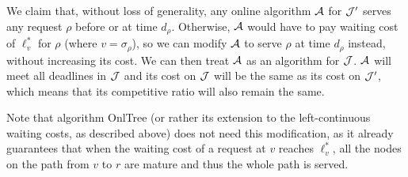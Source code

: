 \documentclass[a4paper]{article}
\newcommand{\calA}{{\cal A}}
\newcommand{\calJ}{{\cal J}}
\newcommand{\length}{\ell}
\newcommand{\OnAlgTreesGeneral}{{\sc OnlTree}}
\newcommand{\trignode}{\sigma}
\begin{document}
We claim that, without loss of generality, any online algorithm
$\calA$ for $\calJ'$ serves any request $\rho$ before or at time $d_\rho$.
Otherwise, $\calA$ would have to pay waiting cost of $\length^\ast_v$ for $\rho$
(where $v = \trignode_\rho$),
so we can modify $\calA$ to serve $\rho$ at time $d_\rho$ instead,
without increasing its cost.
We can then treat $\calA$ as an algorithm for $\calJ$.
$\calA$ will meet all deadlines in $\calJ$ and its cost on $\calJ$ will be
the same as its cost on $\calJ'$, which means that
its competitive ratio will also remain the same.

Note that algorithm {\OnAlgTreesGeneral} (or rather its extension to
the left-continuous waiting costs, as described above) does
not need this modification, as it already guarantees that when the
waiting cost of a request at $v$ reaches $\length^\ast_v$, all the nodes on
the path from $v$ to $r$ are mature and thus the whole path is served.



\end{document}
